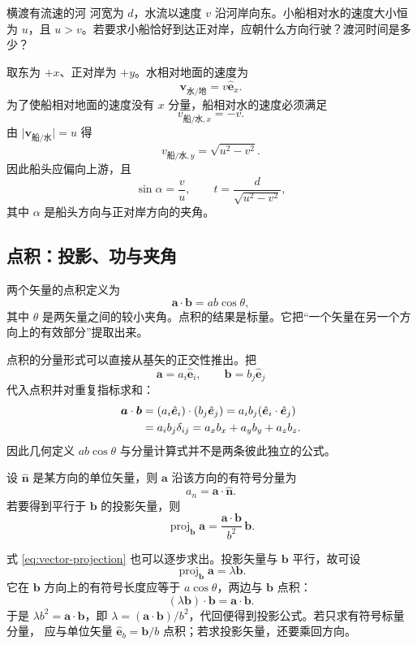 \documentclass[UTF8,zihao=-4,oneside,openany]{ctexbook}
\numberwithin{equation}{section}
\newcommand{\vect}[1]{\bm{#1}}
\newcommand{\uvec}[1]{\hat{\vect{#1}}}
\DeclareMathOperator{\proj}{proj}
\begin{document}
\begin{examplebox}{横渡有流速的河}
河宽为 $d$，水流以速度 $v$ 沿河岸向东。小船相对水的速度大小恒为 $u$，且 $u>v$。若要求小船恰好到达正对岸，应朝什么方向行驶？渡河时间是多少？

\tcblower
取东为 $+x$、正对岸为 $+y$。水相对地面的速度为
\[
  \vect v_{\text{水/地}}=v\uvec e_x.
\]
为了使船相对地面的速度没有 $x$ 分量，船相对水的速度必须满足
\[
  v_{\text{船/水},x}=-v.
\]
由 $\lvert\vect v_{\text{船/水}}\rvert=u$ 得
\[
  v_{\text{船/水},y}=\sqrt{u^2-v^2}.
\]
因此船头应偏向上游，且
\[
  \sin\alpha=\frac{v}{u},
  \qquad
  t=\frac{d}{\sqrt{u^2-v^2}},
\]
其中 $\alpha$ 是船头方向与正对岸方向的夹角。
\end{examplebox}

\subsection{点积：投影、功与夹角}

两个矢量的点积定义为
\begin{equation}
  \vect a\cdot\vect b=ab\cos\theta,
  \label{eq:dot-product}
\end{equation}
其中 $\theta$ 是两矢量之间的较小夹角。点积的结果是标量。它把“一个矢量在另一个方向上的有效部分”提取出来。

点积的分量形式可以直接从基矢的正交性推出。把
\[
  \vect a=a_i\uvec e_i,\qquad \vect b=b_j\uvec e_j
\]
代入点积并对重复指标求和：
\begin{align}
  \vect a\cdot\vect b
  &=(a_i\uvec e_i)\cdot(b_j\uvec e_j)
   =a_ib_j(\uvec e_i\cdot\uvec e_j)\notag\\
  &=a_ib_j\delta_{ij}
   =a_xb_x+a_yb_y+a_zb_z.
  \label{eq:dot-product-components}
\end{align}
因此几何定义 $ab\cos\theta$ 与分量计算式并不是两条彼此独立的公式。

设 $\uvec n$ 是某方向的单位矢量，则 $\vect a$ 沿该方向的有符号分量为
\[
  a_n=\vect a\cdot\uvec n.
\]
若要得到平行于 $\vect b$ 的投影矢量，则
\begin{equation}
  \proj_{\vect b}\vect a
  =\frac{\vect a\cdot\vect b}{b^2}\,\vect b.
  \label{eq:vector-projection}
\end{equation}

式 \eqref{eq:vector-projection} 也可以逐步求出。投影矢量与 $\vect b$ 平行，故可设
\[
  \proj_{\vect b}\vect a=\lambda\vect b.
\]
它在 $\vect b$ 方向上的有符号长度应等于 $a\cos\theta$，两边与 $\vect b$ 点积：
\[
  (\lambda\vect b)\cdot\vect b
  =\vect a\cdot\vect b.
\]
于是 $\lambda b^2=\vect a\cdot\vect b$，即
$\lambda=(\vect a\cdot\vect b)/b^2$，代回便得到投影公式。若只求有符号标量分量，
应与单位矢量 $\uvec e_b=\vect b/b$ 点积；若求投影矢量，还要乘回方向。
\end{document}
